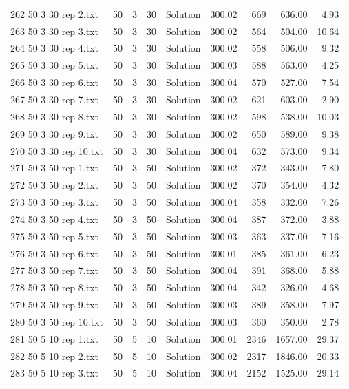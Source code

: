 \begin{longtable}{lrrllrrrr}
262 50 3 30 rep 2.txt & 50 & 3 & 30 & Solution & 300.02 & 669 & 636.00 &  4.93\\
263 50 3 30 rep 3.txt & 50 & 3 & 30 & Solution & 300.02 & 564 & 504.00 & 10.64\\
264 50 3 30 rep 4.txt & 50 & 3 & 30 & Solution & 300.02 & 558 & 506.00 &  9.32\\
265 50 3 30 rep 5.txt & 50 & 3 & 30 & Solution & 300.03 & 588 & 563.00 &  4.25\\
266 50 3 30 rep 6.txt & 50 & 3 & 30 & Solution & 300.04 & 570 & 527.00 &  7.54\\
267 50 3 30 rep 7.txt & 50 & 3 & 30 & Solution & 300.02 & 621 & 603.00 &  2.90\\
268 50 3 30 rep 8.txt & 50 & 3 & 30 & Solution & 300.02 & 598 & 538.00 & 10.03\\
269 50 3 30 rep 9.txt & 50 & 3 & 30 & Solution & 300.02 & 650 & 589.00 &  9.38\\
270 50 3 30 rep 10.txt & 50 & 3 & 30 & Solution & 300.04 & 632 & 573.00 &  9.34\\
271 50 3 50 rep 1.txt & 50 & 3 & 50 & Solution & 300.02 & 372 & 343.00 &  7.80\\
272 50 3 50 rep 2.txt & 50 & 3 & 50 & Solution & 300.02 & 370 & 354.00 &  4.32\\
273 50 3 50 rep 3.txt & 50 & 3 & 50 & Solution & 300.04 & 358 & 332.00 &  7.26\\
274 50 3 50 rep 4.txt & 50 & 3 & 50 & Solution & 300.04 & 387 & 372.00 &  3.88\\
275 50 3 50 rep 5.txt & 50 & 3 & 50 & Solution & 300.03 & 363 & 337.00 &  7.16\\
276 50 3 50 rep 6.txt & 50 & 3 & 50 & Solution & 300.01 & 385 & 361.00 &  6.23\\
277 50 3 50 rep 7.txt & 50 & 3 & 50 & Solution & 300.04 & 391 & 368.00 &  5.88\\
278 50 3 50 rep 8.txt & 50 & 3 & 50 & Solution & 300.04 & 342 & 326.00 &  4.68\\
279 50 3 50 rep 9.txt & 50 & 3 & 50 & Solution & 300.03 & 389 & 358.00 &  7.97\\
280 50 3 50 rep 10.txt & 50 & 3 & 50 & Solution & 300.03 & 360 & 350.00 &  2.78\\
281 50 5 10 rep 1.txt & 50 & 5 & 10 & Solution & 300.01 & 2346 & 1657.00 & 29.37\\
282 50 5 10 rep 2.txt & 50 & 5 & 10 & Solution & 300.02 & 2317 & 1846.00 & 20.33\\
283 50 5 10 rep 3.txt & 50 & 5 & 10 & Solution & 300.04 & 2152 & 1525.00 & 29.14\\

\end{longtable}
